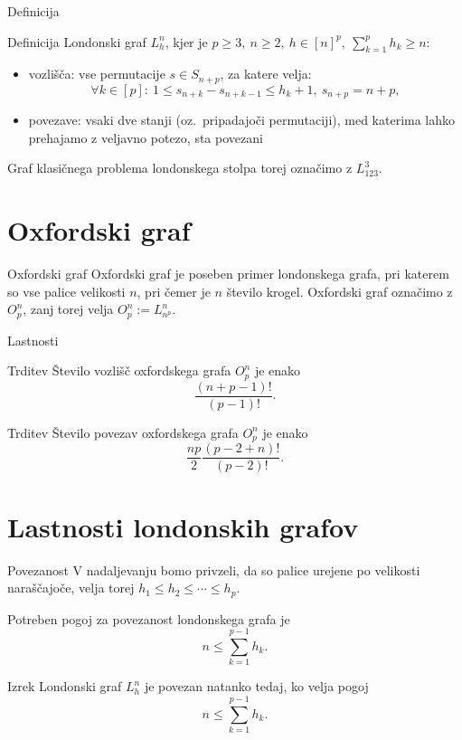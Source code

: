 \documentclass[dvipsnames]{beamer}
\begin{document}
\begin{frame}{Definicija}
    \begin{block}{Definicija}
        \alert{Londonski graf} $L_h^n$, kjer je $p \geq 3,\ n \geq 2,\ h \in [n]^p,\  \sum_{k=1}^p h_k \geq n$:
        \begin{itemize}
            \item vozlišča: vse permutacije $s \in S_{n+p}$, za katere velja:
            \[\forall k \in [p]:\ 1 \leq s_{n+k} - s_{n+k-1} \leq h_k + 1,\ s_{n+p} = n + p ,\]
            \item povezave: vsaki dve stanji (oz.\ pripadajoči permutaciji), med katerima lahko prehajamo z veljavno potezo, sta povezani
        \end{itemize}
    \end{block}
    \medskip
    Graf klasičnega problema londonskega stolpa torej označimo z $L^3_{123}$.

\end{frame}

\section{Oxfordski graf}
\begin{frame}{Oxfordski graf}
    \alert{Oxfordski graf} je poseben primer londonskega grafa, pri katerem so vse palice velikosti $n$, pri čemer je $n$ število krogel. Oxfordski graf označimo z $O^n_p$, zanj torej velja $O^n_p := L^n_{n^p}$.
\end{frame}

\begin{frame}{Lastnosti}
    \begin{block}{Trditev}
        Število vozlišč oxfordskega grafa $O^n_p$ je enako \[\frac{(n+p-1)!}{(p-1)!}.\]
    \end{block}    
    \begin{block}{Trditev}
        Število povezav oxfordskega grafa $O^n_p$ je enako
        \[ \frac{np}{2} \frac{(p-2+n)!}{(p-2)!} .\]
    \end{block}    
\end{frame}

\section{Lastnosti londonskih grafov}
\begin{frame}{Povezanost}
    V nadaljevanju bomo privzeli, da so palice urejene po velikosti naraščajoče, velja torej $h_1 \leq h_2 \leq \cdots \leq h_p$.
    
    Potreben pogoj za povezanost londonskega grafa je 
    \[ n \leq \sum_{k=1}^{p-1} h_k. \]
    \begin{block}{Izrek}
        Londonski graf $L_h^n$ je povezan natanko tedaj, ko velja pogoj
        \[ n \leq \sum_{k=1}^{p-1} h_k. \]
    \end{block}
\end{frame}
\end{document}
